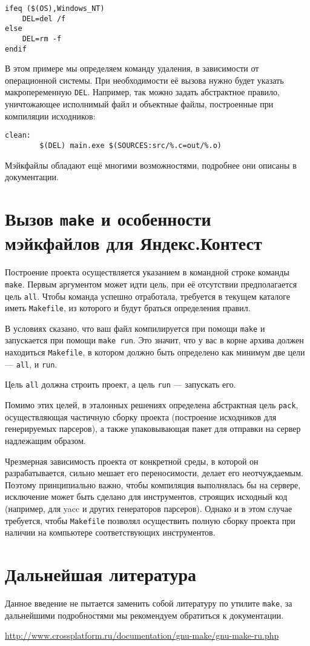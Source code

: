 \documentclass[11pt,a4paper,oneside]{article}
\begin{document}
\begin{verbatim}
ifeq ($(OS),Windows_NT)
    DEL=del /f
else
    DEL=rm -f
endif
\end{verbatim}

В этом примере мы определяем команду удаления, в зависимости от операционной системы.
При необходимости её вызова нужно будет указать макропеременную \verb!DEL!. Например, так
можно задать абстрактное правило, уничтожающее исполнимый файл и объектные файлы, 
построенные при компиляции исходников:

\begin{verbatim}
clean:
        $(DEL) main.exe $(SOURCES:src/%.c=out/%.o)
\end{verbatim}

Мэйкфайлы обладают ещё многими возможностями, подробнее они описаны в документации.

\section*{Вызов \texttt{make} и особенности мэйкфайлов для Яндекс.Контест}

Построение проекта осуществляется указанием в командной строке команды \verb!make!.
Первым аргументом может идти цель, при её отсутствии предполагается цель \verb!all!.
Чтобы команда успешно отработала, требуется в текущем каталоге иметь \verb!Makefile!,
из которого и будут браться определения правил.

В условиях сказано, что ваш файл компилируется при помощи \verb!make! и запускается при
помощи \verb!make run!. Это значит, что у вас в корне архива должен находиться 
\verb!Makefile!, в котором должно быть определено как минимум две
цели --- \verb!all!, и \verb!run!. 

Цель \verb!all! должна строить проект, а цель \verb!run! --- запускать его.

Помимо этих целей, в эталонных решениях определена абстрактная цель \verb!pack!, 
осуществляющая частичную сборку проекта (построение исходников для генерируемых парсеров), 
а также упаковывающая пакет для отправки на сервер надлежащим образом.

Чрезмерная зависимость проекта от конкретной среды, в которой он разрабатывается,
сильно мешает его переносимости, делает его неотчуждаемым. Поэтому 
принципиально важно, чтобы компиляция выполнялась бы на сервере, исключение может быть
сделано для инструментов, строящих исходный код (например, для yacc и других генераторов парсеров).
Однако и в этом случае требуется, чтобы \verb!Makefile! позволял осуществить полную
сборку проекта при наличии на компьютере соответствующих инструментов.

\section*{Дальнейшая литература}

Данное введение не пытается заменить собой литературу по утилите \verb!make!, за 
дальнейшими подробностями мы рекомендуем обратиться к документации.

\url{http://www.crossplatform.ru/documentation/gnu-make/gnu-make-ru.php}
\end{document}
